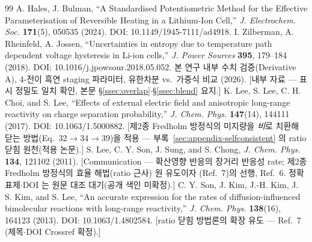 \begin{thebibliography}{99}
 A. Hales, J. Bulman, ``A Standardised Potentiometric Method for the Effective Parameterisation of Reversible Heating in a Lithium-Ion Cell,'' \emph{J. Electrochem. Soc.} \textbf{171}(5), 050535 (2024). DOI: 10.1149/1945-7111/ad4918.
 I. Zilberman, A. Rheinfeld, A. Jossen, ``Uncertainties in entropy due to temperature path dependent voltage hysteresis in Li-ion cells,'' \emph{J. Power Sources} \textbf{395}, 179--184 (2018). DOI: 10.1016/j.jpowsour.2018.05.052.
 본 연구 내부 수치 검증(Derivative A),  4-전이 흑연 staging 파라미터, 유한차분 vs.\ 가중식 비교 (2026). [내부 자료 --- 표시 정밀도 일치 확인, 본문 \S\ref{ssec:overlap}$\cdot$\S\ref{ssec:blend} 요지.]
 K. Lee, S. Lee, C. H. Choi, and S. Lee, ``Effects of external electric field and anisotropic long-range reactivity on charge separation probability,'' \emph{J. Chem. Phys.} \textbf{147}(14), 144111 (2017). DOI: 10.1063/1.5000882. [제2종 Fredholm 방정식의 미지량을 \emph{비}로 치환해 닫는 방법(Eq.~32$\to$34$\to$39)을 적용 --- 부록~\ref{sec:appendix-selfconsistent} 의 ratio 닫힘 원천(적용 논문).]
 S. Lee, C. Y. Son, J. Sung, and S. Chong, \emph{J. Chem. Phys.} \textbf{134}, 121102 (2011). [Communication --- 확산영향 반응의 장거리 반응성 rate; 제2종 Fredholm 방정식의 효율 해법(ratio 근사) 원 유도이자 \cite{son2013jcp}(Ref.~7)의 선행, \cite{lee2017jcp} Ref.~6. 정확 표제$\cdot$DOI 는 원문 대조 대기(공개 색인 미확정).]
 C. Y. Son, J. Kim, J.-H. Kim, J. S. Kim, and S. Lee, ``An accurate expression for the rates of diffusion-influenced bimolecular reactions with long-range reactivity,'' \emph{J. Chem. Phys.} \textbf{138}(16), 164123 (2013). DOI: 10.1063/1.4802584. [ratio 닫힘 방법론의 확장 유도 --- \cite{lee2017jcp} Ref.~7 (제목$\cdot$DOI Crossref 확정).]
\end{thebibliography}
